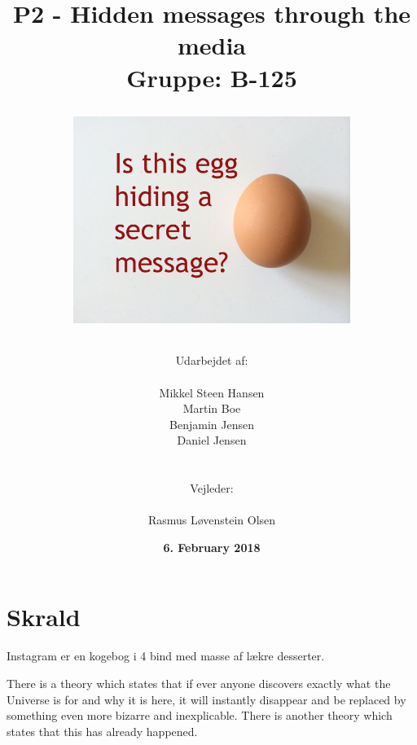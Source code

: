 \documentclass[11pt]{article}
\title{
    P2 - Hidden messages through the media 
    \\ 
    Gruppe: B-125
    \\
    \begin{figure}[!h]
        \centering
        \includegraphics[width=0.8\textwidth, angle =0]{Projectdoc/Egg-Message.jpg}
        \label{fig:FrontPage}
    \end{figure}
}
\author{
    Udarbejdet af:\\
    \\
    Mikkel Steen Hansen\\
    Martin Boe\\
    Benjamin Jensen\\
    Daniel Jensen\\
    \\\\
    Vejleder:\\ 
    \\
    Rasmus Løvenstein Olsen\\
}
\date{\textbf{6. February 2018}}
\renewcommand{\baselinestretch}{1.20}
\begin{document}
    \begin{titlepage}
        \clearpage
        \maketitle
        \thispagestyle{empty}
    \end{titlepage}
    
    \renewcommand{\baselinestretch}{0.8} 
    \tableofcontents
    \renewcommand{\baselinestretch}{1.20} 
    
    \newpage
    
    
    
    
    
    \section{Skrald}
        Instagram er en kogebog i 4 bind med masse af lækre desserter.
        
        There is a theory which states that if ever anyone discovers exactly what the Universe is for and why it is here, it will instantly disappear and be replaced by something even more bizarre and inexplicable.
        There is another theory which states that this has already happened.
    \newpage

    
    \newpage

    \printbibliography
\end{document}
